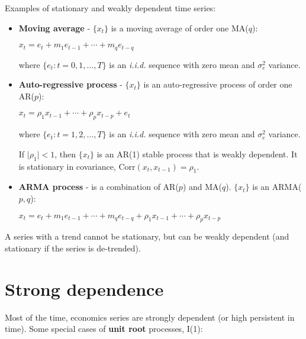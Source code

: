\documentclass[10pt, a4paper, landscape]{article}
\newcommand{\Corr}{\mathrm{Corr}}
\begin{document}
\begin{multicols}{3}
		Examples of stationary and weakly dependent time series:
		
		\begin{itemize}[leftmargin=*]
			\item \textbf{Moving average} - $\lbrace x_{t} \rbrace$ is a moving average of order one MA($q$):
			
			\begin{center}
				$x_{t} = e_{t} + m_{1} e_{t - 1} + \cdots + m_{q} e_{t - q}$
			\end{center}
			
			where $\lbrace e_{t} : t = 0, 1, \ldots, T \rbrace$ is an \textsl{i.i.d.} sequence with zero mean and $\sigma^{2}_{e}$ variance.
			
			\item \textbf{Auto-regressive process} - $\lbrace x_{t} \rbrace$ is an auto-regressive process of order one AR($p$):
			
			\begin{center}
				$x_{t} = \rho_{1} x_{t - 1} + \cdots + \rho_{p} x_{t - p}+ e_{t}$
			\end{center}
			
			where $\lbrace e_{t} : t = 1, 2, \ldots, T \rbrace$ is an \textsl{i.i.d.} sequence with zero mean and $\sigma^{2}_{e}$ variance.
			
			If $\lvert \rho_{1} \rvert < 1$, then $\lbrace x_{t} \rbrace$ is an AR(1) stable process that is weakly dependent. It is stationary in covariance, $\Corr(x_{t}, x_{t - 1}) = \rho_{1}$.
		
		\columnbreak
		
			\item \textbf{ARMA process} - is a combination of AR($p$) and MA($q$). $\lbrace x_{t} \rbrace$ is an ARMA($p, q$):
			
			\begin{center}
				$x_{t} = e_{t} + m_{1} e_{t - 1} + \cdots + m_{q} e_{t - q} + \rho_{1} x_{t - 1} + \cdots + \rho_{p} x_{t - p}$
			\end{center}
		\end{itemize}
		
		A series with a trend cannot be stationary, but can be weakly dependent (and stationary if the series is de-trended).
		
		\section*{Strong dependence}
		
		Most of the time, economics series are strongly dependent (or high persistent in time). Some special cases of \textbf{unit root} processes, I(1):
		

\end{multicols}
\end{document}
